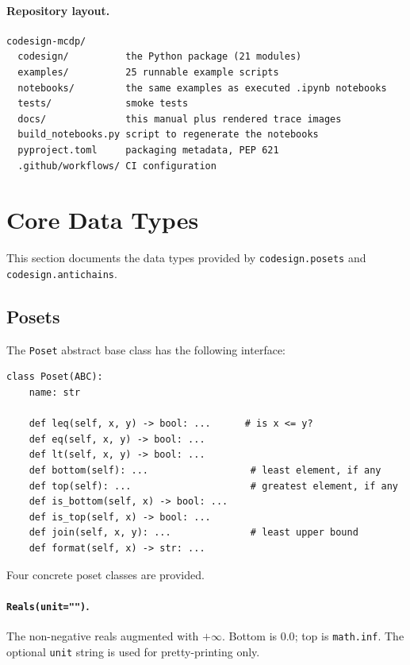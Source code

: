 \documentclass[11pt,a4paper]{article}
\begin{document}
\paragraph{Repository layout.}
\begin{verbatim}
codesign-mcdp/
  codesign/          the Python package (21 modules)
  examples/          25 runnable example scripts
  notebooks/         the same examples as executed .ipynb notebooks
  tests/             smoke tests
  docs/              this manual plus rendered trace images
  build_notebooks.py script to regenerate the notebooks
  pyproject.toml     packaging metadata, PEP 621
  .github/workflows/ CI configuration
\end{verbatim}

\section{Core Data Types}
\label{sec:posets}

This section documents the data types provided by
\texttt{codesign.posets} and \texttt{codesign.antichains}.

\subsection{Posets}

The \texttt{Poset} abstract base class has the following interface:

\begin{lstlisting}
class Poset(ABC):
    name: str

    def leq(self, x, y) -> bool: ...      # is x <= y?
    def eq(self, x, y) -> bool: ...
    def lt(self, x, y) -> bool: ...
    def bottom(self): ...                  # least element, if any
    def top(self): ...                     # greatest element, if any
    def is_bottom(self, x) -> bool: ...
    def is_top(self, x) -> bool: ...
    def join(self, x, y): ...              # least upper bound
    def format(self, x) -> str: ...
\end{lstlisting}

Four concrete poset classes are provided.

\paragraph{\texttt{Reals(unit="")}.} The non-negative reals augmented
with $+\infty$. Bottom is $0.0$; top is \texttt{math.inf}. The optional
\texttt{unit} string is used for pretty-printing only.
\end{document}
